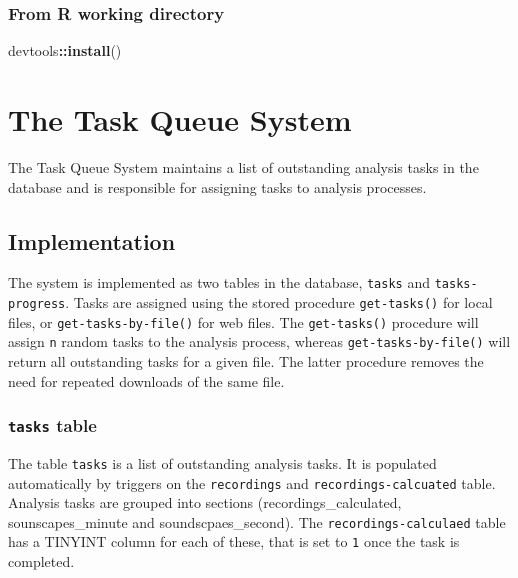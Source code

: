 \documentclass[
]{book}
\newenvironment{Shaded}{\begin{snugshade}}{\end{snugshade}}
\newcommand{\FunctionTok}[1]{\textcolor[rgb]{0.13,0.29,0.53}{\textbf{#1}}}
\newcommand{\NormalTok}[1]{#1}
\newcommand{\SpecialCharTok}[1]{\textcolor[rgb]{0.81,0.36,0.00}{\textbf{#1}}}
\begin{document}
\hypertarget{from-r-working-directory}{%
\subsection{From R working directory}\label{from-r-working-directory}}

\begin{Shaded}
\begin{Highlighting}[]
\NormalTok{devtools}\SpecialCharTok{::}\FunctionTok{install}\NormalTok{()}
\end{Highlighting}
\end{Shaded}

\hypertarget{the-task-queue-system}{%
\chapter{The Task Queue System}\label{the-task-queue-system}}

The Task Queue System maintains a list of outstanding analysis tasks in the database and is responsible for assigning tasks to analysis processes.

\hypertarget{implementation}{%
\section{Implementation}\label{implementation}}

The system is implemented as two tables in the database, \texttt{tasks} and \texttt{tasks-progress}. Tasks are assigned using the stored procedure \texttt{get-tasks()} for local files, or \texttt{get-tasks-by-file()} for web files. The \texttt{get-tasks()} procedure will assign \texttt{n} random tasks to the analysis process, whereas \texttt{get-tasks-by-file()} will return all outstanding tasks for a given file. The latter procedure removes the need for repeated downloads of the same file.

\hypertarget{tasks-table}{%
\subsection{\texorpdfstring{\texttt{tasks} table}{tasks table}}\label{tasks-table}}

The table \texttt{tasks} is a list of outstanding analysis tasks. It is populated automatically by triggers on the \texttt{recordings} and \texttt{recordings-calcuated} table. Analysis tasks are grouped into sections (recordings\_calculated, sounscapes\_minute and soundscpaes\_second). The \texttt{recordings-calculaed} table has a TINYINT column for each of these, that is set to \texttt{1} once the task is completed.
\end{document}
